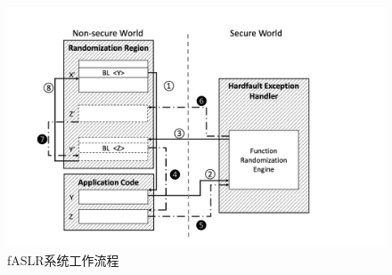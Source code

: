 \documentclass[12pt,a4paper]{ctexart}
\numberwithin{figure}{section}
\begin{document}
\begin{figure}[h]
    \centering
    \includegraphics[scale=0.8]{graph/workflow.png}
    \caption{fASLR系统工作流程}
    \label{fig:workflow}
\end{figure}
\end{document}
